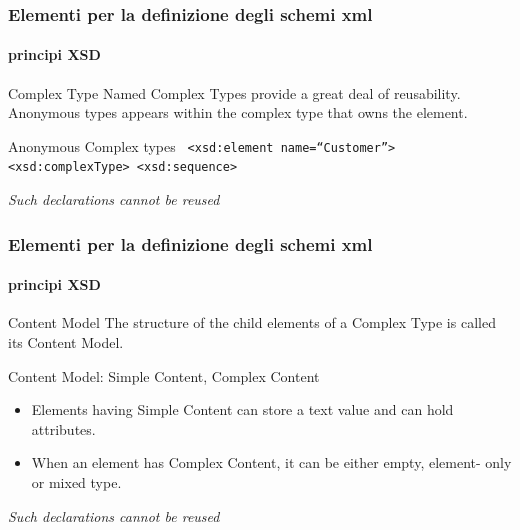 \begin{frame}
	\frametitle{Elementi per la definizione degli schemi xml}
	\framesubtitle{principi XSD}
	\addtocounter{nframe}{1}

	\begin{block}{Complex Type}
		Named Complex Types provide a great deal of reusability.
		Anonymous types appears within the complex type that owns the element.

	\end{block}

	\begin{block}{Anonymous Complex types}
		\texttt{
			<xsd:element name=``Customer''>
			<xsd:complexType>
			<xsd:sequence>
		}
	\end{block}
	\textit{Such declarations cannot be reused}
\end{frame}


\begin{frame}
	\frametitle{Elementi per la definizione degli schemi xml}
	\framesubtitle{principi XSD}
	\addtocounter{nframe}{1}

	\begin{block}{Content Model}
		The structure of the child elements of a Complex Type is called its Content Model.
	\end{block}

	\begin{block}{Content Model: Simple Content, Complex Content}
		\begin{itemize}
			\item Elements having Simple Content can store a text value and can hold attributes.
			\item When an element has Complex Content, it can be either empty, element- only or mixed type.
		\end{itemize}
	\end{block}
	\textit{Such declarations cannot be reused}
\end{frame}

